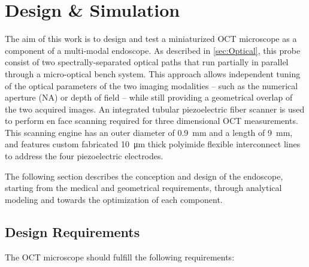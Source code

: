 %

\chapter{Design \& Simulation}
\label{Ch:DesignSimulation}	

The aim of this work is to design and test a miniaturized OCT microscope as a component of a multi-modal endoscope. As described in \autoref{sec:Optical}, this probe consist of two spectrally-separated optical paths that run partially in parallel through a micro-optical bench system. This approach allows independent tuning of the optical parameters of the two imaging modalities -- such as the numerical aperture (NA) or depth of field -- while still providing a geometrical overlap of the two acquired images. An integrated tubular piezoelectric fiber scanner is used to perform en face scanning required for three dimensional OCT measurements. This scanning engine has an outer diameter of \SI{0.9}{\milli\meter} and a length of \SI{9}{\milli\meter}, and features custom fabricated \SI{10}{\micro\meter} thick polyimide flexible interconnect lines to address the four piezoelectric electrodes.

The following section describes the conception and design of the endoscope, starting from the medical and geometrical requirements, through analytical modeling and towards the optimization of each component.

\section{Design Requirements}



The OCT microscope should fulfill the following requirements:

